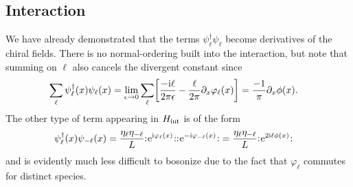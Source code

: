 \documentclass[english, parskip=full]{scrartcl}
\begin{document}
\subsection{Interaction}
We have already demonstrated that the terms $\psi_\ell^\dagger\psi_\ell$ become derivatives of the chiral fields.
There is no normal-ordering built into the interaction, but note that summing on $\ell$ also cancels the divergent constant since
\begin{align}
\sum_\ell \psi_\ell^\dagger(x) \psi_\ell(x) &= \lim_{\epsilon\rightarrow 0} \sum_\ell \klb*{\frac{-\i\ell}{2\pi\epsilon} - \frac{\ell}{2\pi}\partial_x\varphi_\ell(x)} = \frac{-1}{\pi}\partial_x\phi(x).
\end{align}
The other type of term appearing in $H_{\text{int}}$ is of the form
\begin{align}
\psi_\ell^\dagger(x)\psi_{-\ell}(x) &= \frac{\eta_\ell \eta_{-\ell}}{L} {:\mathrel{\mspace{1mu}\text{e}^{\text{i}\varphi_\ell(x)}\mspace{1mu}}:} {:\mathrel{\mspace{1mu}\text{e}^{-\text{i}\varphi_{-\ell}(x)}\mspace{1mu}}:} = \frac{\eta_\ell \eta_{-\ell}}{L} {:\mathrel{\mspace{1mu}\text{e}^{2\text{i}\ell\phi(x)}\mspace{1mu}}:}
\end{align}
and is evidently much less difficult to bosonize due to the fact that $\varphi_\ell$ commutes for distinct species.
\end{document}
